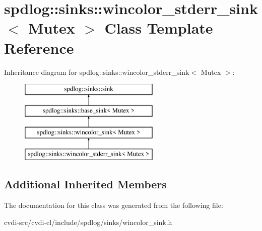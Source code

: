 \hypertarget{classspdlog_1_1sinks_1_1wincolor__stderr__sink}{}\section{spdlog\+:\+:sinks\+:\+:wincolor\+\_\+stderr\+\_\+sink$<$ Mutex $>$ Class Template Reference}
\label{classspdlog_1_1sinks_1_1wincolor__stderr__sink}
Inheritance diagram for spdlog\+:\+:sinks\+:\+:wincolor\+\_\+stderr\+\_\+sink$<$ Mutex $>$\+:\begin{figure}[H]
\begin{center}
\leavevmode
\includegraphics[height=4.000000cm]{classspdlog_1_1sinks_1_1wincolor__stderr__sink}
\end{center}
\end{figure}
\subsection*{Additional Inherited Members}


The documentation for this class was generated from the following file\+:\begin{DoxyCompactItemize}
\item 
cvdi-\/src/cvdi-\/cl/include/spdlog/sinks/wincolor\+\_\+sink.\+h\end{DoxyCompactItemize}
